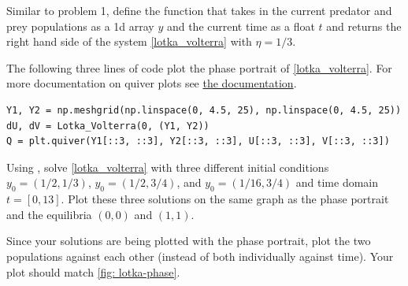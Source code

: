 \begin{problem}
Similar to problem 1, define the function  that takes in the current predator and prey populations as a 1d array $y$ and the current time as a float $t$ and returns the right hand side of the system \eqref{lotka_volterra} with $\eta=1/3$.

The following three lines of code plot the phase portrait of \eqref{lotka_volterra}. 
For more documentation on quiver plots see \href{https://matplotlib.org/api/_as_gen/matplotlib.pyplot.quiver.html}{the documentation}.
\begin{lstlisting}
Y1, Y2 = np.meshgrid(np.linspace(0, 4.5, 25), np.linspace(0, 4.5, 25))
dU, dV = Lotka_Volterra(0, (Y1, Y2))
Q = plt.quiver(Y1[::3, ::3], Y2[::3, ::3], U[::3, ::3], V[::3, ::3])
\end{lstlisting}
Using , solve \eqref{lotka_volterra} with three different initial conditions $y_0 = (1/2, 1/3)$, $y_0=(1/2, 3/4)$, and $y_0=(1/16, 3/4)$ and time domain $t = [0,13]$. Plot these three solutions on the same graph as the phase portrait and the equilibria $(0,0)$ and $(1,1)$.

Since your solutions are being plotted with the phase portrait, plot the two populations against each other (instead of both individually against time). Your plot should match \ref{fig: lotka-phase}.
\end{problem}
